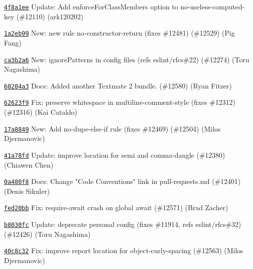 \begin{DoxyItemize}
\item \href{https://github.com/eslint/eslint/commit/4f8a1ee1c26ccb5882e5e83ea7eab2f406c7476b}{\texttt{ {\ttfamily 4f8a1ee}}} Update\+: Add enforce\+For\+Class\+Members option to no-\/useless-\/computed-\/key (\#12110) (ark120202)
\item \href{https://github.com/eslint/eslint/commit/1a2eb99f11c65813bba11d6576a06cff2b823cc9}{\texttt{ {\ttfamily 1a2eb99}}} New\+: new rule no-\/constructor-\/return (fixes \#12481) (\#12529) (Pig Fang)
\item \href{https://github.com/eslint/eslint/commit/ca3b2a62c9e829dc4534bca3643d6bc729b46df0}{\texttt{ {\ttfamily ca3b2a6}}} New\+: ignore\+Patterns in config files (refs eslint/rfcs\#22) (\#12274) (Toru Nagashima)
\item \href{https://github.com/eslint/eslint/commit/60204a3620e33a078c1c35fa2e5d839a16c627ff}{\texttt{ {\ttfamily 60204a3}}} Docs\+: Added another Textmate 2 bundle. (\#12580) (Ryan Fitzer)
\item \href{https://github.com/eslint/eslint/commit/62623f9f611a3adb79696304760a2fd14be8afbc}{\texttt{ {\ttfamily 62623f9}}} Fix\+: preserve whitespace in multiline-\/comment-\/style (fixes \#12312) (\#12316) (Kai Cataldo)
\item \href{https://github.com/eslint/eslint/commit/17a8849491a983f6cb8e98da8c0c9d52ff5f2aa6}{\texttt{ {\ttfamily 17a8849}}} New\+: Add no-\/dupe-\/else-\/if rule (fixes \#12469) (\#12504) (Milos Djermanovic)
\item \href{https://github.com/eslint/eslint/commit/41a78fd7ce245cad8ff6a96c42f5840688849427}{\texttt{ {\ttfamily 41a78fd}}} Update\+: improve location for semi and comma-\/dangle (\#12380) (Chiawen Chen)
\item \href{https://github.com/eslint/eslint/commit/0a480f8307a0e438032f484254941e6426748143}{\texttt{ {\ttfamily 0a480f8}}} Docs\+: Change "{}\+Code Conventions"{} link in pull-\/requests.\+md (\#12401) (Denis Sikuler)
\item \href{https://github.com/eslint/eslint/commit/fed20bb039cf9f53adfcf93e467f418c5e958f45}{\texttt{ {\ttfamily fed20bb}}} Fix\+: require-\/await crash on global await (\#12571) (Brad Zacher)
\item \href{https://github.com/eslint/eslint/commit/b8030fc23e88f57a04d955b3befd1ab0fc2c5d10}{\texttt{ {\ttfamily b8030fc}}} Update\+: deprecate personal config (fixes \#11914, refs eslint/rfcs\#32) (\#12426) (Toru Nagashima)
\item \href{https://github.com/eslint/eslint/commit/40c8c3264c7c383d98c9faf9c4cb4f8b75aee40f}{\texttt{ {\ttfamily 40c8c32}}} Fix\+: improve report location for object-\/curly-\/spacing (\#12563) (Milos Djermanovic)

\end{DoxyItemize}

